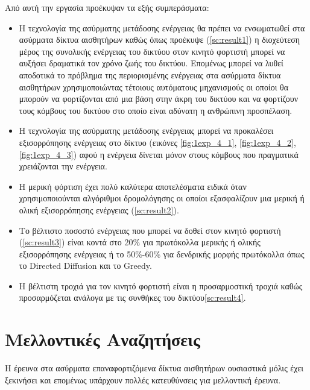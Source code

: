 Από αυτή την εργασία προέκυψαν τα εξής συμπεράσματα:
\begin{itemize}
\item Η τεχνολογία της ασύρματης μετάδοσης ενέργειας θα πρέπει να ενσωματωθεί στα ασύρματα δίκτυα αισθητήρων καθώς όπως προέκυψε (\ref{sc:result1}) η διοχεύτεση
μέρος της συνολικής ενέργειας του δικτύου στον κινητό φορτιστή μπορεί να αυξήσει δραματικά τον χρόνο ζωής του δικτύου. Επομένως μπορεί να λυθεί αποδοτικά το πρόβλημα
της περιορισμένης ενέργειας στα ασύρματα δίκτυα αισθητήρων χρησιμοποιώντας τέτοιους αυτόματους μηχανισμούς οι οποίοι θα μπορούν να φορτίζονται από μια βάση στην άκρη
του δικτύου και να φορτίζουν τους κόμβους του δικτύου στο οποίο είναι αδύνατη η ανθρώπινη προσπέλαση.
\item Η τεχνολογία της ασύρματης μετάδοσης ενέργειας μπορεί να προκαλέσει εξισορρόπησης ενέργειας στο δίκτυο (εικόνες \ref{fig:1exp_4_1}, \ref{fig:1exp_4_2},
\ref{fig:1exp_4_3}) αφού η ενέργεια δίνεται μόνον στους κόμβους που πραγματικά χρειάζονται την ενέργεια.
\item Η μερική φόρτιση έχει πολύ καλύτερα αποτελέσματα ειδικά όταν χρησιμοποιούνται αλγόριθμοι δρομολόγησης οι οποίοι εξασφαλίζουν μια μερική ή ολική εξισορρόπησης
ενέργειας (\ref{sc:result2}).
\item Το βέλτιστο ποσοστό ενέργειας που μπορεί να δοθεί στον κινητό φορτιστή (\ref{sc:result3}) είναι κοντά στο 20\% για πρωτόκολλα μερικής ή ολικής εξισορρόπησης
ενέργειας ή το 50\%-60\% για δενδρικής μορφής πρωτόκολλα όπως το Directed Diffusion \cite{directed_diffusion} και το Greedy\cite{greedy_protocol}.
\item H βέλτιστη τροχιά για τον κινητό φορτιστή είναι η προσαρμοστική τροχιά καθώς προσαρμόζεται ανάλογα με τις συνθήκες του δικτύου\ref{sc:result4}.
\end{itemize}

\section{Μελλοντικές Αναζητήσεις}
Η έρευνα στα ασύρματα επαναφορτιζόμενα δίκτυα αισθητήρων ουσιαστικά μόλις έχει ξεκινήσει και επομένως υπάρχουν πολλές κατευθύνσεις για μελλοντική έρευνα.

